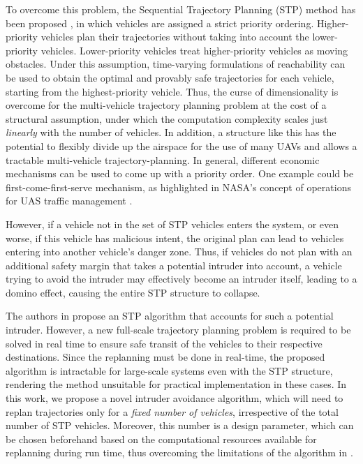 To overcome this problem, the Sequential Trajectory Planning (STP) method has been proposed \cite{Chen15c, Bansal2017}, in which vehicles are assigned a strict priority ordering. Higher-priority vehicles plan their trajectories without taking into account the lower-priority vehicles. Lower-priority vehicles treat higher-priority vehicles as moving obstacles. Under this assumption, time-varying formulations of reachability \cite{Bokanowski11, Fisac15} can be used to obtain the optimal and provably safe trajectories for each vehicle, starting from the highest-priority vehicle. Thus, the curse of dimensionality is overcome for the multi-vehicle trajectory planning problem at the cost of a structural assumption, under which the computation complexity scales just \textit{linearly} with the number of vehicles. In addition, a structure like this has the potential to flexibly divide up the airspace for the use of many UAVs and allows a tractable multi-vehicle trajectory-planning. In general, different economic mechanisms can be used to come up with a priority order. One example could be first-come-first-serve mechanism, as highlighted in NASA’s concept of operations for UAS traffic management \cite{Kopardekar16}. 

However, if a vehicle not in the set of STP vehicles enters the system, or even worse, if this vehicle has malicious intent, the original plan can lead to vehicles entering into another vehicle's danger zone. Thus, if vehicles do not plan with an additional safety margin that takes a potential intruder into account, a vehicle trying to avoid the intruder may effectively become an intruder itself, leading to a domino effect, causing the entire STP structure to collapse. 

The authors in \cite{chen2016robust} propose an STP algorithm that accounts for such a potential intruder. However, a new full-scale trajectory planning problem is required to be solved in real time to ensure safe transit of the vehicles to their respective destinations. Since the replanning must be done in real-time, the proposed algorithm is intractable for large-scale systems even with the STP structure, rendering the method unsuitable for practical implementation in these cases. In this work, we propose a novel intruder avoidance algorithm, which will need to replan trajectories only for a \textit{fixed number of vehicles}, irrespective of the total number of STP vehicles. Moreover, this number is a design parameter, which can be chosen beforehand based on the computational resources available for replanning during run time, thus overcoming the limitations of the algorithm in \cite{chen2016robust}. 

